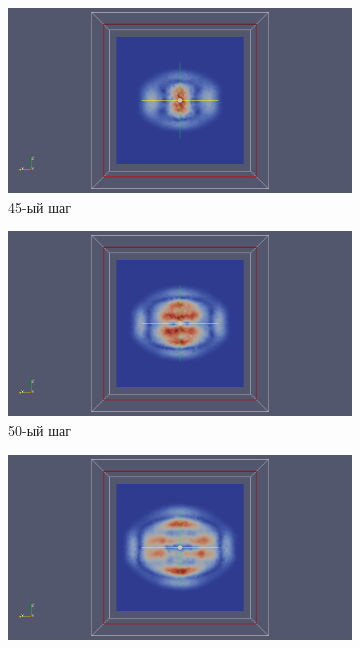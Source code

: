 \begin{figure}[H]
\begin{subfigure}[b]{0.5\textwidth}
\centering
\includegraphics[width=1.0\textwidth]{png/two-graphite-layers/slice2_45.png}
\caption{45-ый шаг}
\end{subfigure}
\begin{subfigure}[b]{0.5\textwidth}
\centering
\includegraphics[width=1.0\textwidth]{png/two-graphite-layers/slice2_50.png}
\caption{50-ый шаг}
\end{subfigure}
\begin{subfigure}[b]{0.5\textwidth}
\centering
\includegraphics[width=1.0\textwidth]{png/two-graphite-layers/slice2_55.png}

\end{subfigure}
\end{figure}
